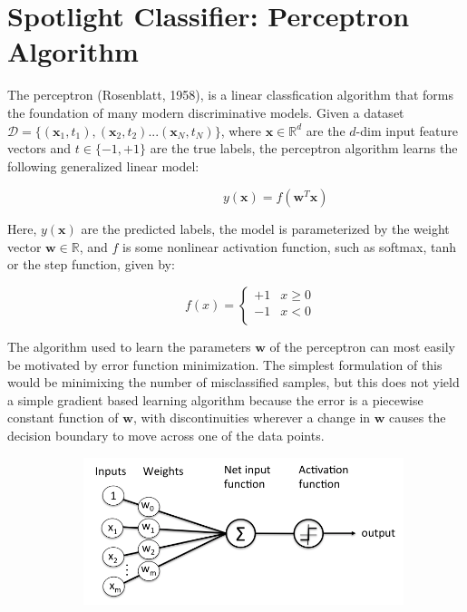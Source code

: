 \documentclass{article} %
\begin{document}
\section{Spotlight Classifier: Perceptron Algorithm}


The perceptron (Rosenblatt, 1958), is a linear classfication algorithm that forms the foundation of many modern discriminative models. Given a dataset $\mathcal{D} = \{(\bm{x}_1,t_1),(\bm{x}_2,t_2)...(\bm{x}_N,t_N)\}$, where  $\bm{x}\in \mathbb{R}^d$ are the $d$-dim input feature vectors and $t \in \{-1,+1\}$ are the true labels, the perceptron algorithm learns the following generalized linear model:

$\quad \qquad \qquad \qquad \qquad \qquad \qquad \qquad \qquad y(\bm{x}) = f(\bm{w}^T\bm{x})$

Here, $y(\bm{x})$ are the predicted labels, the model is parameterized by the weight vector $\bm{w} \in \mathbb{R}$, and $f$ is some nonlinear activation function, such as softmax, tanh or the step function, given by:

$ \qquad \qquad \qquad \qquad \qquad \qquad \qquad f(x) = \begin{cases} +1 & x \geq 0 \\ -1 & x<0 \\ \end{cases}$

The algorithm used to learn the parameters $\bm{w}$ of the perceptron can most easily be motivated by error function minimization. The simplest formulation of this would be minimixing the number of misclassified samples, but this does not yield a simple gradient based learning algorithm because the error is a piecewise constant function of $\bm{w}$, with discontinuities wherever a change in $\bm{w}$ causes the decision boundary to move across one of the data points. \cite{bishop2006pattern}

$\qquad \qquad \qquad ${\includegraphics[width=0.7\textwidth]{perceptron.png}}
\end{document}
